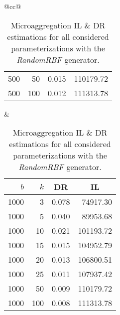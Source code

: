 \begin{table}[H]
\begin{tabular}{@{}cc@{}}
\begin{tabular}{@{}rrrr@{}}
			500  & 50  & 0.015 & 110179.72 \\
			500  & 100 & 0.012 & 111313.78 \\ \bottomrule
		\end{tabular}
		&
		\begin{tabular}{@{}rrrr@{}}
			\toprule
			$b$ & $k$ & \multicolumn{1}{c}{DR} & \multicolumn{1}{c}{IL} \\ \midrule
			1000 & 3   & 0.078 & 74917.30  \\
			1000 & 5   & 0.040 & 89953.68  \\
			1000 & 10  & 0.021 & 101193.72 \\
			1000 & 15  & 0.015 & 104952.79 \\
			1000 & 20  & 0.013 & 106800.51 \\
			1000 & 25  & 0.011 & 107937.42 \\
			1000 & 50  & 0.009 & 110179.72 \\
			1000 & 100 & 0.008 & 111313.78 \\ \bottomrule
		\end{tabular}
	\end{tabular}
	\caption[Microaggregation DR \& IL estimations (RandomRBF).]{Microaggregation IL \& DR estimations for all considered parameterizations with the \textit{RandomRBF} generator.}
	\label{table:results-rbf-microaggregation}
\end{table}

